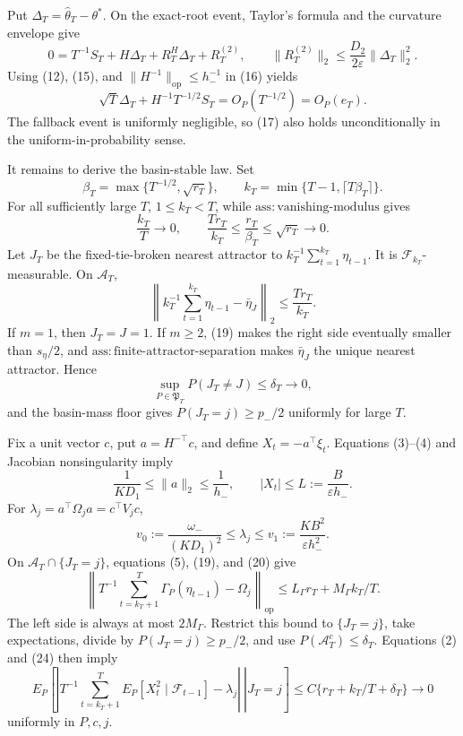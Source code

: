 Put \(\Delta_T=\widehat\theta_T-\theta^*\).  On the exact-root event,
Taylor's formula and the curvature envelope give
\[
 0=T^{-1}S_T+H\Delta_T+R_T^H\Delta_T+R_T^{(2)},
 \qquad
 \|R_T^{(2)}\|_2\le\frac{D_2}{2\varepsilon}\|\Delta_T\|_2^2.
\tag{16}
\]
Using (12), (15), and \(\|H^{-1}\|_{\mathrm{op}}\le h_-^{-1}\) in (16)
yields
\[
 \sqrt T\Delta_T+H^{-1}T^{-1/2}S_T
 =O_P(T^{-1/2})=O_P(e_T).
\tag{17}
\]
The fallback event is uniformly negligible, so (17) also holds
unconditionally in the uniform-in-probability sense.

It remains to derive the basin-stable law.  Set
\[
 \beta_T=\max\{T^{-1/2},\sqrt{r_T}\},\qquad
 k_T=\min\{T-1,\lceil T\beta_T\rceil\}.
\tag{18}
\]
For all sufficiently large \(T\), \(1\le k_T<T\), while
\(\mathrm{ass:vanishing\text{-}modulus}\) gives
\[
 \frac{k_T}{T}\longrightarrow0,
 \qquad \frac{Tr_T}{k_T}\le\frac{r_T}{\beta_T}
 \le\sqrt{r_T}\longrightarrow0.
\tag{19}
\]
Let \(J_T\) be the fixed-tie-broken nearest attractor to
\(k_T^{-1}\sum_{t=1}^{k_T}\eta_{t-1}\).  It is
\(\mathcal F_{k_T}\)-measurable.  On \(\mathcal A_T\),
\[
 \left\|k_T^{-1}\sum_{t=1}^{k_T}\eta_{t-1}-\bar\eta_J\right\|_2
 \le\frac{Tr_T}{k_T}.
\tag{20}
\]
If \(m=1\), then \(J_T=J=1\).  If \(m\ge2\), (19) makes the right side
eventually smaller than \(s_\eta/2\), and
\(\mathrm{ass:finite\text{-}attractor\text{-}separation}\) makes
\(\bar\eta_J\) the unique nearest attractor.  Hence
\[
 \sup_{P\in\mathfrak P_T}P(J_T\ne J)\le\delta_T\longrightarrow0,
\tag{21}
\]
and the basin-mass floor gives \(P(J_T=j)\ge p_-/2\) uniformly for large
\(T\).

Fix a unit vector \(c\), put \(a=H^{-\top}c\), and define
\(X_t=-a^\top\xi_t\).  Equations (3)--(4) and Jacobian nonsingularity imply
\[
 \frac1{KD_1}\le\|a\|_2\le\frac1{h_-},
 \qquad |X_t|\le L:=\frac{B}{\varepsilon h_-}.
\tag{22}
\]
For \(\lambda_j=a^\top\Omega_ja=c^\top V_jc\),
\[
 v_0:=\frac{\omega_-}{(KD_1)^2}\le\lambda_j
 \le v_1:=\frac{KB^2}{\varepsilon h_-^2}.
\tag{23}
\]
On \(\mathcal A_T\cap\{J_T=j\}\), equations (5), (19), and (20) give
\[
 \left\|T^{-1}\sum_{t=k_T+1}^T\Gamma_P(\eta_{t-1})-
 \Omega_j\right\|_{\mathrm{op}}
 \le L_\Gamma r_T+M_\Gamma k_T/T.
\tag{24}
\]
The left side is always at most \(2M_\Gamma\).  Restrict this bound to
\(\{J_T=j\}\), take expectations, divide by
\(P(J_T=j)\ge p_-/2\), and use \(P(\mathcal A_T^c)\le\delta_T\).
Equations (2) and (24) then imply
\[
 E_P\!\left[\left.\left|T^{-1}\sum_{t=k_T+1}^T
 E_P[X_t^2\mid\mathcal F_{t-1}]-\lambda_j\right|
 \ \right|J_T=j\right]
 \le C\{r_T+k_T/T+\delta_T\}\longrightarrow0
\tag{25}
\]
uniformly in \(P,c,j\).


